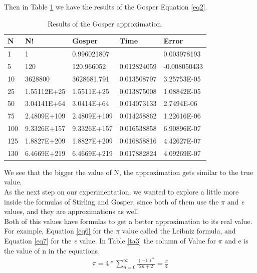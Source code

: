 \documentclass{article}
\begin{document}
 Then in Table \ref{ta2} we have the results of the Gosper Equation \ref{eq2}.
 
 \begin{table}[h!]
\centering
 \caption{Results of the Gosper approximation.} 
 \label{ta2}
 \begin{tabular} {| l | l | l | l | l |}
 \hline
\textbf{N}	&	\textbf{N!}	&	\textbf{Gosper} 	&	\textbf{Time}	&	\textbf{Error}	\\
\hline
1	&	1	&	0.996021807	&		&	0.003978193	\\
\hline
5	&	120	&	120.966052	&	0.012824059	&	-0.008050433	\\
\hline
10	&	3628800	&	3628681.791	&	0.013508797	&	3.25753E-05	\\
\hline
25	&	1.55112E+25	&	1.5511E+25	&	0.013875008	&	1.08842E-05	\\
\hline
50	&	3.04141E+64	&	3.0414E+64	&	0.014073133	&	2.7494E-06	\\
\hline
75	&	2.4809E+109	&	2.4809E+109	&	0.014258862	&	1.22616E-06	\\
\hline
100	&	9.3326E+157	&	9.3326E+157	&	0.016538858	&	6.90896E-07	\\
\hline
125	&	1.8827E+209	&	1.8827E+209	&	0.016858816	&	4.42627E-07	\\
\hline
130	&	6.4669E+219	&	6.4669E+219	&	0.017882824	&	4.09269E-07	\\
\hline
 \end{tabular}
 \end{table}
 
 We see that the bigger the value of N, the approximation gets similar to the true value.\\
 
 As the next step on our experimentation, we wanted to explore a little more inside the formulas of Stirling and Gosper, since both of them use the $\pi$ and \textit{e} values, and they are approximations as well.\\
 
Both of this values have formulas to get a better approximation to its real value. For example, Equation \ref{eq6} for the $\pi$ value called the Leibniz formula, and Equation \ref{eq7} for the \textit{e} value. In Table \ref{ta3} the column of Value for $\pi$ and e is the value of n in the equations.\\

\begin{eqnarray}
\label{eq6}
\pi = 4 * \sum_{n=0}^{\infty} \frac{(-1)^n}{2n+2} = \frac{\pi}{4}
\end{eqnarray}
\end{document}
